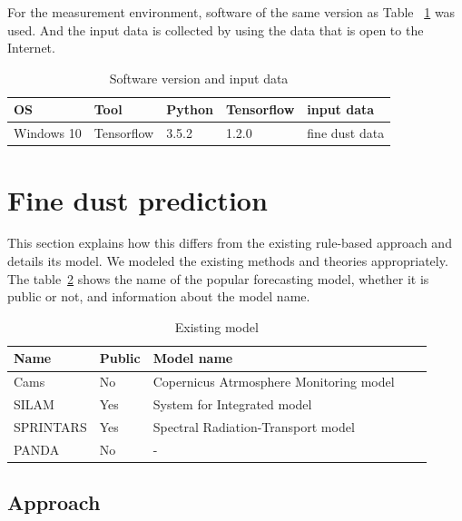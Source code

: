\documentclass{kcc}
\begin{document}
For the measurement environment, software of the same version as Table ~\ref{tab:config} was used.
And the input data is collected by using the data that is open to the Internet.

\begin{table}[h!]
  \caption{Software version and input data}
  \centering
  \small
  \begin{tabular}{l l l l l} \toprule
    OS & Tool & Python & Tensorflow & input data\\
    \midrule
    Windows 10 & Tensorflow & 3.5.2 & 1.2.0 & fine dust data \\
    \bottomrule
  \end{tabular}
  \label{tab:config}
\end{table}

\section{Fine dust prediction}
This section explains how this differs from the existing rule-based approach and details its model. We modeled the existing methods and theories appropriately.
The table~\ref{tab:Company} shows the name of the popular forecasting model, whether it is public or not, and information about the model name.

\begin{table}[h!]
  \caption{Existing model}
  \centering
  \scriptsize 
  \begin{tabular}{l l l l l} \toprule 
    Name & Public & Model name \\
    \midrule
    Cams & No & Copernicus Atrmosphere Monitoring model \\
    \midrule
    SILAM & Yes & System for Integrated model\\
    \midrule
    SPRINTARS & Yes & Spectral Radiation-Transport model\\
    \midrule
    PANDA & No & -\\
    \bottomrule
  \end{tabular}
  \label{tab:Company}
\end{table}

\subsection{Approach}
\end{document}
